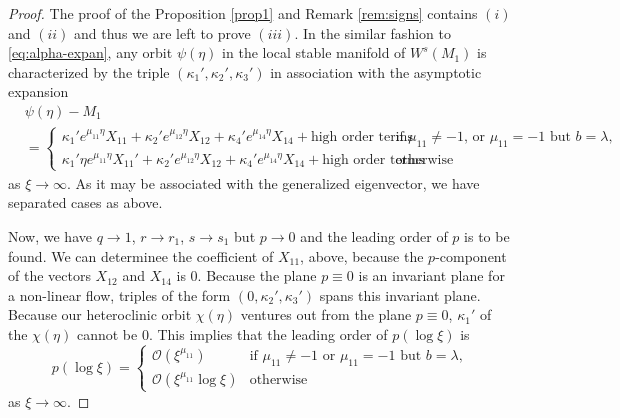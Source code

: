 \documentclass[a4paper,11pt]{article}
\def\BO{{\mathcal{O}}}
\theoremstyle{remark}
\begin{document}
\begin{proof}
The proof of the Proposition \ref{prop1} and Remark \ref{rem:signs} contains $(i)$ and $(ii)$ and thus we are left to prove $(iii)$. In the similar fashion to \eqref{eq:alpha-expan}, any orbit $\psi(\eta)$ in the local stable manifold of $W^s(M_1)$ is characterized by the triple $(\kappa_1',\kappa_2',\kappa_3')$ in association with the asymptotic expansion
\begin{equation}
\begin{aligned}
 &\psi(\eta) -M_1\\
 &= \begin{cases} \kappa_1'e^{\mu_{11}\eta}X_{11} + \kappa_2'e^{\mu_{12}\eta}X_{12} + \kappa_4'e^{\mu_{14}\eta}X_{14} + \text{high order terms} & \text{if $\mu_{11}\ne-1$, or $\mu_{11}=-1$ but $b=\lambda$,}\\
 \kappa_1'\eta e^{\mu_{11}\eta}X_{11}' + \kappa_2'e^{\mu_{12}\eta}X_{12} + \kappa_4'e^{\mu_{14}\eta}X_{14} + \text{high order terms} & \text{otherwise }
 \end{cases}
\end{aligned}
\end{equation}
as $\xi \rightarrow \infty$. As it may be associated with the generalized eigenvector, we have separated cases as above.

Now, we have $q \rightarrow 1$, $r \rightarrow r_1$, $s \rightarrow s_1$ but $p \rightarrow 0$ and the leading order of $p$ is to be found. We can determinee the coefficient of $X_{11}$, above, because the $p$-component of the vectors $X_{12}$ and $X_{14}$ is $0$. Because the plane $p\equiv0$ is an invariant plane for a non-linear flow, triples of the form $(0,\kappa_2',\kappa_3')$ spans this invariant plane. Because our heteroclinic orbit $\chi(\eta)$ ventures out from the plane $p\equiv0$, $\kappa_1'$ of the $\chi(\eta)$ cannot be $0$.
This implies that the leading order of $p(\log\xi)$ is
$$p(\log\xi) = \begin{cases} \BO(\xi^{\mu_{11}}) & \text{if $\mu_{11}\ne-1$ or $\mu_{11}=-1$ but $b=\lambda$,}\\
 \BO(\xi^{\mu_{11}}\log\xi) & \text{otherwise}
 \end{cases}
 $$
as $\xi \rightarrow \infty$.


\end{proof}
\end{document}
